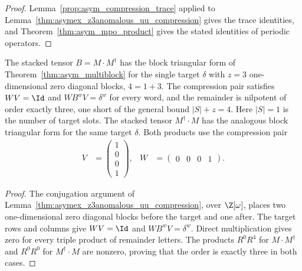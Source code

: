 \begin{proof}
    \leanok
    Lemma~\ref{prop:asym_compression_trace} applied to
    Lemma~\ref{thm:asymex_z3anomalous_uu_compression} gives the trace identities, and
    Theorem~\ref{thm:asym_mpo_product} gives the stated identities of periodic operators.
\end{proof}

\begin{lemma}
    \label{thm:asymex_z3anomalous_ud_compression}
    \leanok
    The stacked tensor $B=M\cdot M^\dagger$ has the block triangular form of
    Theorem~\ref{thm:asym_multiblock} for the single target $\delta$ with $z=3$
    one-dimensional zero diagonal blocks, $4=1+3$. The compression pair satisfies
    $WV=\Id$ and $WB^wV=\delta^w$ for every word, and the remainder is nilpotent of
    order exactly three, one short of the general bound $|S|+z=4$.
    Here $|S|=1$ is the number of target slots.
    The stacked tensor $M^\dagger\cdot M$ has the analogous block triangular
    form for the same target $\delta$. Both products use the compression pair
    \begin{align}
        V & =\begin{pmatrix}1\\0\\0\\1\end{pmatrix}, &
        W & =\begin{pmatrix}0&0&0&1\end{pmatrix}.
    \end{align}
\end{lemma}

\begin{proof}
    \leanok
    The conjugation argument of
    Lemma~\ref{thm:asymex_z3anomalous_uu_compression}, over $\Z[\omega]$,
    places two one-dimensional zero diagonal blocks before the target and
    one after. The target rows and columns give $WV=\Id$ and
    $WB^wV=\delta^w$. Direct multiplication gives zero for every triple
    product of remainder letters. The products $R^0R^4$ for
    $M\cdot M^\dagger$ and $R^0R^0$ for $M^\dagger\cdot M$ are nonzero,
    proving that the order is exactly three in both cases.
\end{proof}

